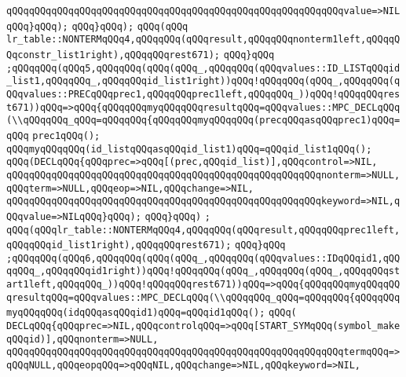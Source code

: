 \verb|qQQqqQQqqQQqqQQqqQQqqQQqqQQqqQQqqQQqqQQqqQQqqQQqqQQqqQQqqQQqvalue=>NILqQQq}qQQq);|\newline
\verb|qQQq}qQQq);|\newline
\verb|qQQq(qQQq|\newline
\verb|lr_table::NONTERMqQQq4,qQQqqQQq(qQQqresult,qQQqqQQqnonterm1left,qQQqqQQqconstr_list1right),qQQqqQQqrest671);|\newline
\verb|qQQq}qQQq|\newline
\verb|;qQQqqQQq(qQQq5,qQQqqQQq(qQQq(qQQq_,qQQqqQQq(qQQqvalues::ID_LISTqQQqid_list1,qQQqqQQq_,qQQqqQQqid_list1right))qQQq!qQQqqQQq(qQQq_,qQQqqQQq(qQQqvalues::PRECqQQqprec1,qQQqqQQqprec1left,qQQqqQQq_))qQQq!qQQqqQQqrest671))qQQq=>qQQq{qQQqqQQqmyqQQqqQQqresultqQQq=qQQqvalues::MPC_DECLqQQq(\\qQQqqQQq_qQQq=qQQqqQQq{qQQqqQQqmyqQQqqQQq(precqQQqasqQQqprec1)qQQq=qQQq|\newline
\verb|prec1qQQq();|\newline
\verb|qQQqmyqQQqqQQq(id_listqQQqasqQQqid_list1)qQQq=qQQqid_list1qQQq();|\newline
\verb|qQQq(DECLqQQq{qQQqprec=>qQQq[(prec,qQQqid_list)],qQQqcontrol=>NIL,|\newline
\verb|qQQqqQQqqQQqqQQqqQQqqQQqqQQqqQQqqQQqqQQqqQQqqQQqqQQqqQQqnonterm=>NULL,qQQqterm=>NULL,qQQqeop=>NIL,qQQqchange=>NIL,|\newline
\verb|qQQqqQQqqQQqqQQqqQQqqQQqqQQqqQQqqQQqqQQqqQQqqQQqqQQqqQQqkeyword=>NIL,qQQqvalue=>NILqQQq}qQQq);|\newline
\verb|qQQq}qQQq)|\newline
\verb|;|\newline
\verb|qQQq(qQQqlr_table::NONTERMqQQq4,qQQqqQQq(qQQqresult,qQQqqQQqprec1left,qQQqqQQqid_list1right),qQQqqQQqrest671);|\newline
\verb|qQQq}qQQq|\newline
\verb|;qQQqqQQq(qQQq6,qQQqqQQq(qQQq(qQQq_,qQQqqQQq(qQQqvalues::IDqQQqid1,qQQqqQQq_,qQQqqQQqid1right))qQQq!qQQqqQQq(qQQq_,qQQqqQQq(qQQq_,qQQqqQQqstart1left,qQQqqQQq_))qQQq!qQQqqQQqrest671))qQQq=>qQQq{qQQqqQQqmyqQQqqQQqresultqQQq=qQQqvalues::MPC_DECLqQQq(\\qQQqqQQq_qQQq=qQQqqQQq{qQQqqQQqmyqQQqqQQq(idqQQqasqQQqid1)qQQq=qQQqid1qQQq();|\newline
\verb|qQQq(|\newline
\verb|DECLqQQq{qQQqprec=>NIL,qQQqcontrolqQQq=>qQQq[START_SYMqQQq(symbol_makeqQQqid)],qQQqnonterm=>NULL,|\newline
\verb|qQQqqQQqqQQqqQQqqQQqqQQqqQQqqQQqqQQqqQQqqQQqqQQqqQQqqQQqqQQqtermqQQq=>qQQqNULL,qQQqeopqQQq=>qQQqNIL,qQQqchange=>NIL,qQQqkeyword=>NIL,|\newline
